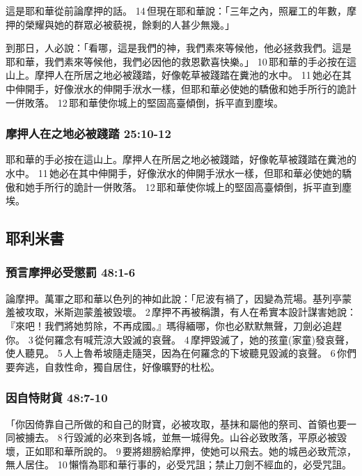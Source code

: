 這是耶和華從前論摩押的話。 14 但現在耶和華說：「三年之內，照雇工的年數，摩押的榮耀與她的群眾必被藐視，餘剩的人甚少無幾。」

到那日，人必說：「看哪，這是我們的神，我們素來等候他，他必拯救我們。這是耶和華，我們素來等候他，我們必因他的救恩歡喜快樂。」 10 耶和華的手必按在這山上。摩押人在所居之地必被踐踏，好像乾草被踐踏在糞池的水中。 11 她必在其中伸開手，好像洑水的伸開手洑水一樣，但耶和華必使她的驕傲和她手所行的詭計一併敗落。 12 耶和華使你城上的堅固高臺傾倒，拆平直到塵埃。

\subsubsection{摩押人在之地必被踐踏 25:10-12}
耶和華的手必按在這山上。摩押人在所居之地必被踐踏，好像乾草被踐踏在糞池的水中。 11 她必在其中伸開手，好像洑水的伸開手洑水一樣，但耶和華必使她的驕傲和她手所行的詭計一併敗落。 12 耶和華使你城上的堅固高臺傾倒，拆平直到塵埃。

\subsection{耶利米書}
\subsubsection{預言摩押必受懲罰 48:1-6}
論摩押。萬軍之耶和華以色列的神如此說：「尼波有禍了，因變為荒場。基列亭蒙羞被攻取，米斯迦蒙羞被毀壞。 2 摩押不再被稱讚，有人在希實本設計謀害她說：『來吧！我們將她剪除，不再成國。』瑪得緬哪，你也必默默無聲，刀劍必追趕你。 3 從何羅念有喊荒涼大毀滅的哀聲。 4 摩押毀滅了，她的孩童(家童)發哀聲，使人聽見。 5 人上魯希坡隨走隨哭，因為在何羅念的下坡聽見毀滅的哀聲。 6 你們要奔逃，自救性命，獨自居住，好像曠野的杜松。

\subsubsection{因自恃財貨 48:7-10}
「你因倚靠自己所做的和自己的財寶，必被攻取，基抹和屬他的祭司、首領也要一同被擄去。 8 行毀滅的必來到各城，並無一城得免。山谷必致敗落，平原必被毀壞，正如耶和華所說的。 9 要將翅膀給摩押，使她可以飛去。她的城邑必致荒涼，無人居住。 10 懶惰為耶和華行事的，必受咒詛；禁止刀劍不經血的，必受咒詛。

